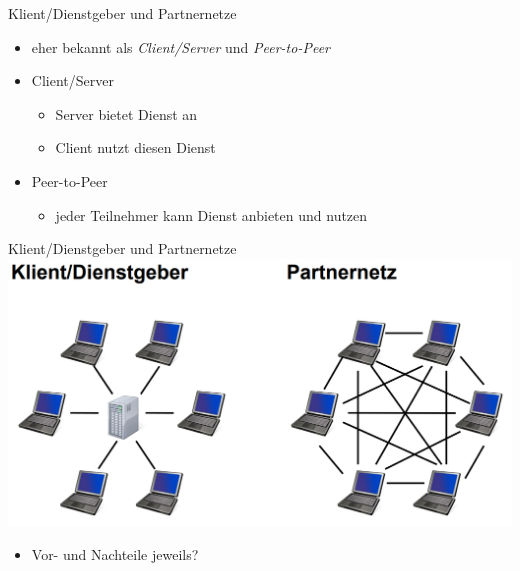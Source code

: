\documentclass[18pt]{beamer}
\begin{document}
\begin{frame}{Klient/Dienstgeber und Partnernetze}
	\begin{itemize}
		\item eher bekannt als \emph{Client/Server} und \emph{Peer-to-Peer}
		\item Client/Server
		\begin{itemize}
			\item Server bietet Dienst an
			\item Client nutzt diesen Dienst
		\end{itemize}
		\item Peer-to-Peer
		\begin{itemize}
			\item jeder Teilnehmer kann Dienst anbieten und nutzen
		\end{itemize}
	\end{itemize}
\end{frame}

\begin{frame}{Klient/Dienstgeber und Partnernetze}
	\centering \includegraphics[scale=0.3]{pics/tut3/client-server-peer.png}
	\begin{itemize}
		\item Vor- und Nachteile jeweils?
	\end{itemize}
\end{frame}
\end{document}
